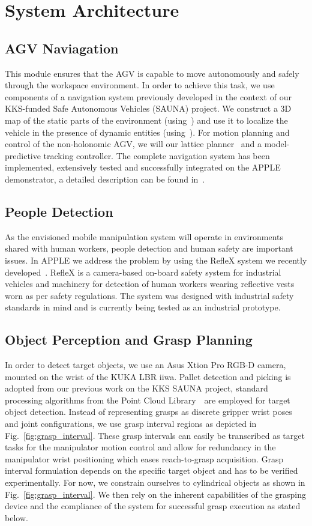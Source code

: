 \section{System Architecture}
\label{sec:arch}

\subsection{AGV Naviagation}
\label{subsec:navigation}
%
This module ensures that the AGV is capable to move autonomously and safely through the workspace
environment. In order to achieve this task, we use components of a navigation system previously
developed in the context of our KKS-funded Safe Autonomous Vehicles (SAUNA) project. We construct a
3D map of the static parts of the environment (using~\cite{Stoy13}) and use it to localize the
vehicle in the presence of dynamic entities (using~\cite{Vale14}). For motion planning and control
of the non-holonomic AGV, we will our lattice planner~\cite{Ciri14} and a model-predictive tracking
controller. The complete navigation system has been implemented, extensively tested and successfully
integrated on the APPLE demonstrator, a detailed description can be found in~\cite{Andr15}.
%
\subsection{People Detection}
\label{subsec:people_det}
%
As the envisioned mobile manipulation system will operate in environments shared with human workers,
people detection and human safety are important issues. In APPLE we address the problem by using the
RefleX system we recently developed~\cite{Mosb14}. RefleX is a camera-based on-board safety system
for industrial vehicles and machinery for detection of human workers wearing reflective vests worn
as per safety regulations. The system was designed with industrial safety standards in mind and is
currently being tested as an industrial prototype.
%
\subsection{Object Perception and Grasp Planning}
\label{subsec:perception_planning}
%
In order to detect target objects, we use an Asus Xtion Pro RGB-D camera, mounted on the wrist of
the KUKA LBR iiwa. Pallet detection and picking is adopted from our previous work on the KKS SAUNA
project, standard processing algorithms from the Point Cloud Library~\cite{Rusu11}~are employed for
target object detection. Instead of representing grasps as discrete gripper wrist poses and joint
configurations, we use grasp interval regions as depicted in Fig.~\ref{fig:grasp_interval}. These
grasp intervals can easily be transcribed as target tasks for the manipulator motion control and
allow for redundancy in the manipulator wrist positioning which eases reach-to-grasp
acquisition. Grasp interval formulation depends on the specific target object and has to be verified
experimentally. For now, we constrain ourselves to cylindrical objects as shown in
Fig.~\ref{fig:grasp_interval}. We then rely on the inherent capabilities of the grasping device and
the compliance of the system for successful grasp execution as stated below.
%
